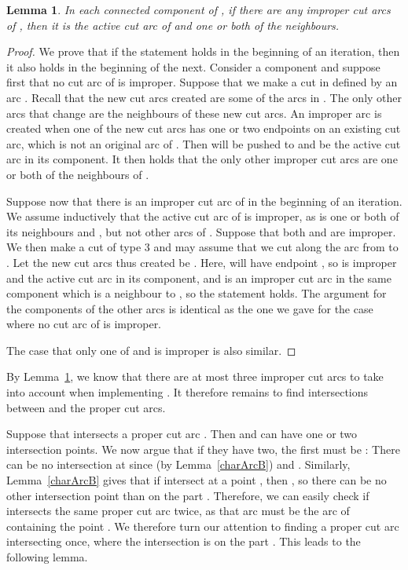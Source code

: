 \documentclass{article}
\newtheorem{lemma}[theorem]{Lemma}
\begin{document}
\begin{lemma}\label{lem:improper}
In each connected component  of , if there are any improper cut arcs of , then it is the active cut arc of  and one or both of the neighbours.
\end{lemma}

\begin{proof}
We prove that if the statement holds in the beginning of an iteration, then it also holds in the beginning of the next.
Consider a component  and suppose first that no cut arc of  is improper.
Suppose that we make a cut in  defined by an arc .
Recall that the new cut arcs created are some of the arcs  in .
The only other arcs that change are the neighbours of these new cut arcs.
An improper arc is created when one of the new cut arcs  has one or two endpoints on an existing cut arc, which is not an original arc of .
Then  will be pushed to  and be the active cut arc in its component. 
It then holds that the only other improper cut arcs are one or both of the neighbours of .

Suppose now that there is an improper cut arc of  in the beginning of an iteration.
We assume inductively that the active cut arc  of  is improper, as is one or both of its neighbours  and , but not other arcs of .
Suppose that both  and  are improper. 
We then make a cut of type 3 and may assume that we cut along the arc  from  to .
Let the new cut arcs thus created be .
Here,  will have endpoint , so  is improper and the active cut arc in its component, and  is an improper cut arc in the same component which is a neighbour to , so the statement holds.
The argument for the components of the other arcs  is identical as the one we gave for the case where no cut arc of  is improper.

The case that only one of  and  is improper is also similar.
\end{proof}

By Lemma~\ref{lem:improper}, we know that there are at most three improper cut arcs to take into account when implementing .
It therefore remains to find intersections between  and the proper cut arcs.

Suppose that  intersects a proper cut arc .
Then  and  can have one or two intersection points.
We now argue that if they have two, the first must be : There can be no intersection at  since  (by Lemma~\ref{charArcB}) and .
Similarly, Lemma~\ref{charArcB} gives that if  intersect at a point , then , so there can be no other intersection point than  on the part .
Therefore, we can easily check if  intersects the same proper cut arc twice, as that arc must be the arc of  containing the point .
We therefore turn our attention to finding a proper cut arc intersecting  once, where the intersection is on the part .
This leads to the following lemma.
\end{document}
